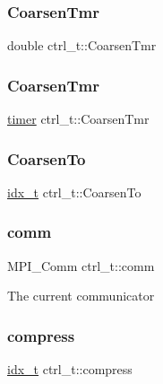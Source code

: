 \subsubsection{\texorpdfstring{Coarsen\+Tmr}{CoarsenTmr}\hspace{0.1cm}{\footnotesize\ttfamily [1/2]}}
{\footnotesize\ttfamily double ctrl\+\_\+t\+::\+Coarsen\+Tmr}

\mbox{\label{structctrl__t_a108d417b55d602e138bdb44b8d80f245}} 
\subsubsection{\texorpdfstring{Coarsen\+Tmr}{CoarsenTmr}\hspace{0.1cm}{\footnotesize\ttfamily [2/2]}}
{\footnotesize\ttfamily \hyperlink{libparmetis_2struct_8h_aae821c36bb7e6918e1414484f939c3d4}{timer} ctrl\+\_\+t\+::\+Coarsen\+Tmr}

\mbox{\label{structctrl__t_a5f4e7c5bbef13001912e0bb3a161862e}} 
\subsubsection{\texorpdfstring{Coarsen\+To}{CoarsenTo}}
{\footnotesize\ttfamily \hyperlink{3rd_party_2parmetis-4_80_83_2metis_2include_2metis_8h_aaa5262be3e700770163401acb0150f52}{idx\+\_\+t} ctrl\+\_\+t\+::\+Coarsen\+To}

\mbox{\label{structctrl__t_a5ecd63179c45d9dfac0ed80074ac3ab8}} 
\subsubsection{\texorpdfstring{comm}{comm}}
{\footnotesize\ttfamily M\+P\+I\+\_\+\+Comm ctrl\+\_\+t\+::comm}

The current communicator \mbox{\label{structctrl__t_ac9e93fdb03a2eefa04a25f6035983428}} 
\subsubsection{\texorpdfstring{compress}{compress}}
{\footnotesize\ttfamily \hyperlink{3rd_party_2parmetis-4_80_83_2metis_2include_2metis_8h_aaa5262be3e700770163401acb0150f52}{idx\+\_\+t} ctrl\+\_\+t\+::compress}

